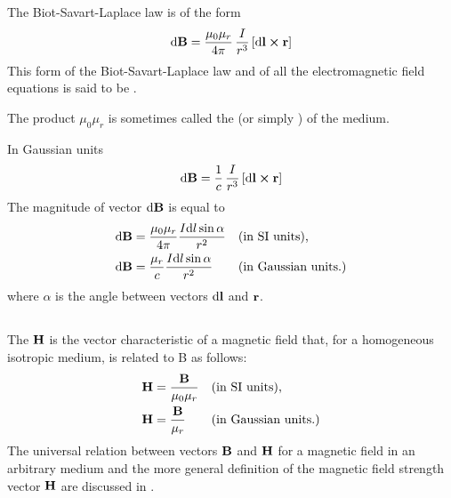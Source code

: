 The Biot-Savart-Laplace law is of the form
\begin{equation*}%
\dd \vb{B} = \frac{\mu_{0} \mu_{r}}{4 \pi} \, \frac{I}{r^{3}} \, [\dd \vb{l} \cross \vb{r}]
\end{equation*}
This form of the Biot-Savart-Laplace law and of all the electromagnetic field equations is said to be .

The product $\mu_{0} \mu_{r}$ is sometimes called the  (or simply ) of the medium.

In Gaussian units 
\begin{equation*}%
\dd \vb{B} = \frac{1}{c} \, \frac{I}{r^{3}} \, [\dd \vb{l} \cross \vb{r}]
\end{equation*}
The magnitude of vector $\dd \vb{B}$ is equal to
\begin{align*}%
\dd \vb{B} & = \frac{\mu_{0} \mu_{r}}{4 \pi} \frac{I \dd l \sin \alpha}{r^{2}} && \text{(in SI units),} \\
\dd \vb{B} & = \frac{\mu_{r}}{c} \frac{I \dd l \sin \alpha}{r^{2}}  && \text{(in Gaussian units.)}
\end{align*}
where $\alpha$ is the angle between vectors $\dd \vb{l}$ and $\vb{r}$.

\subsection{}\label{23.2.3} The  $\vb{H}$ is the vector characteristic of a magnetic field that, for a homogeneous isotropic medium, is related to B as follows:
\begin{align*}%
\vb{H} & = \frac{\vb{B}}{\mu_{0} \mu_{r}} && \text{(in SI units),} \\
\vb{H} & = \frac{\vb{B}}{\mu_{r}}  && \text{(in Gaussian units.)}
\end{align*}
The universal relation between vectors $\vb{B}$ and $\vb{H}$ for a magnetic field in an arbitrary medium and the more general definition of the magnetic field strength vector $\vb{H}$ are discussed in .

